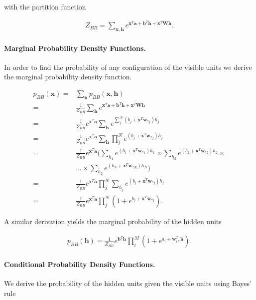 \documentclass[%
oneside,                 %
final,                   %
10pt]{article}
\begin{document}
with the partition function

\begin{align}
	Z_{BB} = \sum_{\bm{x}, \bm{h}} e^{\bm{x}^T \bm{a} + \bm{b}^T \bm{h} + \bm{x}^T \bm{W} \bm{h}} .
\end{align}

\paragraph{Marginal Probability Density Functions.}
In order to find the probability of any configuration of the visible units we derive the marginal probability density function.

\begin{align}
	p_{BB} (\bm{x}) =& \sum_{\bm{h}} p_{BB} (\bm{x}, \bm{h}) \\
	=& \frac{1}{Z_{BB}} \sum_{\bm{h}} e^{\bm{x}^T \bm{a} + \bm{b}^T \bm{h} + \bm{x}^T \bm{W} \bm{h}} \nonumber \\
	=& \frac{1}{Z_{BB}} e^{\bm{x}^T \bm{a}} \sum_{\bm{h}} e^{\sum_j^N (b_j + \bm{x}^T \bm{w}_{\ast j})h_j} \nonumber \\
	=& \frac{1}{Z_{BB}} e^{\bm{x}^T \bm{a}} \sum_{\bm{h}} \prod_j^N e^{ (b_j + \bm{x}^T \bm{w}_{\ast j})h_j} \nonumber \\
	=& \frac{1}{Z_{BB}} e^{\bm{x}^T \bm{a}} \bigg ( \sum_{h_1} e^{(b_1 + \bm{x}^T \bm{w}_{\ast 1})h_1}
	\times \sum_{h_2} e^{(b_2 + \bm{x}^T \bm{w}_{\ast 2})h_2} \times \nonumber \\
	& ... \times \sum_{h_2} e^{(b_N + \bm{x}^T \bm{w}_{\ast N})h_N} \bigg ) \nonumber \\
	=& \frac{1}{Z_{BB}} e^{\bm{x}^T \bm{a}} \prod_j^N \sum_{h_j} e^{(b_j + \bm{x}^T \bm{w}_{\ast j}) h_j} \nonumber \\
	=& \frac{1}{Z_{BB}} e^{\bm{x}^T \bm{a}} \prod_j^N (1 + e^{b_j + \bm{x}^T \bm{w}_{\ast j}}) .
\end{align}

A similar derivation yields the marginal probability of the hidden units

\begin{align}
	p_{BB} (\bm{h}) = \frac{1}{Z_{BB}} e^{\bm{b}^T \bm{h}} \prod_i^M (1 + e^{a_i + \bm{w}_{i\ast}^T \bm{h}}) .
\end{align}

\paragraph{Conditional Probability Density Functions.}
We derive the probability of the hidden units given the visible units using Bayes' rule
\end{document}
